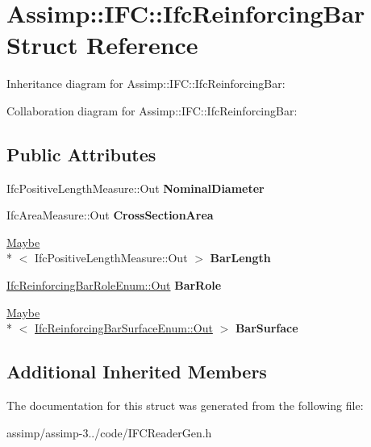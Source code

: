 \hypertarget{struct_assimp_1_1_i_f_c_1_1_ifc_reinforcing_bar}{\section{Assimp\+:\+:I\+F\+C\+:\+:Ifc\+Reinforcing\+Bar Struct Reference}
\label{struct_assimp_1_1_i_f_c_1_1_ifc_reinforcing_bar}
}


Inheritance diagram for Assimp\+:\+:I\+F\+C\+:\+:Ifc\+Reinforcing\+Bar\+:


Collaboration diagram for Assimp\+:\+:I\+F\+C\+:\+:Ifc\+Reinforcing\+Bar\+:
\subsection*{Public Attributes}
\begin{DoxyCompactItemize}
\item 
\hypertarget{struct_assimp_1_1_i_f_c_1_1_ifc_reinforcing_bar_a50bfa07661c26ddcc04215d54c467f8b}{Ifc\+Positive\+Length\+Measure\+::\+Out {\bfseries Nominal\+Diameter}}\label{struct_assimp_1_1_i_f_c_1_1_ifc_reinforcing_bar_a50bfa07661c26ddcc04215d54c467f8b}

\item 
\hypertarget{struct_assimp_1_1_i_f_c_1_1_ifc_reinforcing_bar_a3d07022c322aca4b22298e65753a489c}{Ifc\+Area\+Measure\+::\+Out {\bfseries Cross\+Section\+Area}}\label{struct_assimp_1_1_i_f_c_1_1_ifc_reinforcing_bar_a3d07022c322aca4b22298e65753a489c}

\item 
\hypertarget{struct_assimp_1_1_i_f_c_1_1_ifc_reinforcing_bar_acacce188fa92d4acfa3bb269b7588e80}{\hyperlink{struct_assimp_1_1_s_t_e_p_1_1_maybe}{Maybe}\\*
$<$ Ifc\+Positive\+Length\+Measure\+::\+Out $>$ {\bfseries Bar\+Length}}\label{struct_assimp_1_1_i_f_c_1_1_ifc_reinforcing_bar_acacce188fa92d4acfa3bb269b7588e80}

\item 
\hypertarget{struct_assimp_1_1_i_f_c_1_1_ifc_reinforcing_bar_acd68e43c7aebeb42777de403c11382bf}{\hyperlink{classboost_1_1shared__ptr}{Ifc\+Reinforcing\+Bar\+Role\+Enum\+::\+Out} {\bfseries Bar\+Role}}\label{struct_assimp_1_1_i_f_c_1_1_ifc_reinforcing_bar_acd68e43c7aebeb42777de403c11382bf}

\item 
\hypertarget{struct_assimp_1_1_i_f_c_1_1_ifc_reinforcing_bar_ae33f2ce580bd881f4d36d8e2e80ce2a3}{\hyperlink{struct_assimp_1_1_s_t_e_p_1_1_maybe}{Maybe}\\*
$<$ \hyperlink{classboost_1_1shared__ptr}{Ifc\+Reinforcing\+Bar\+Surface\+Enum\+::\+Out} $>$ {\bfseries Bar\+Surface}}\label{struct_assimp_1_1_i_f_c_1_1_ifc_reinforcing_bar_ae33f2ce580bd881f4d36d8e2e80ce2a3}

\end{DoxyCompactItemize}
\subsection*{Additional Inherited Members}


The documentation for this struct was generated from the following file\+:\begin{DoxyCompactItemize}
\item 
assimp/assimp-\/3../code/I\+F\+C\+Reader\+Gen.\+h\end{DoxyCompactItemize}
